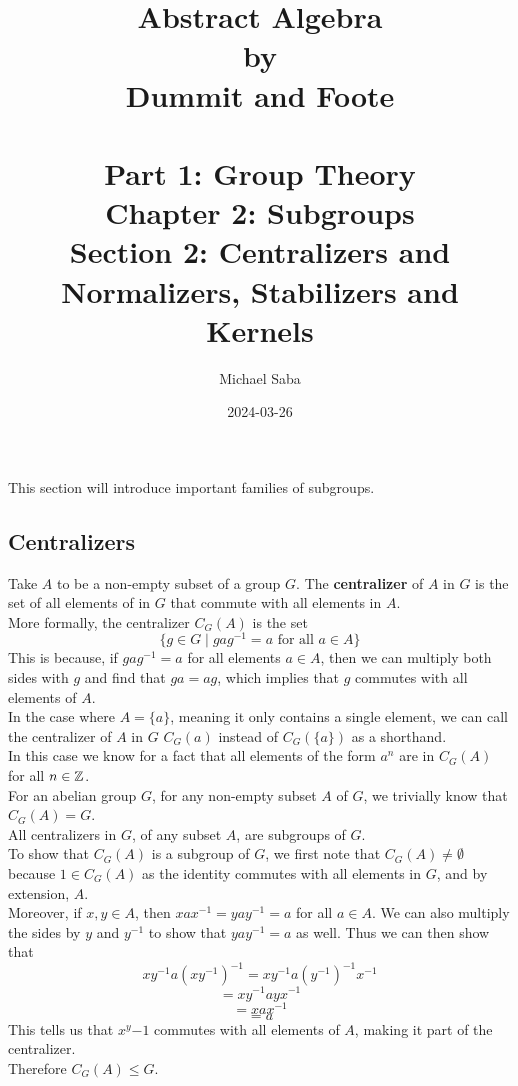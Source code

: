 \documentclass[12pt]{article}
\title{
    \Huge Abstract Algebra \\
    \large by \\
    \Large Dummit and Foote \\~\\
    \huge Part 1: Group Theory \\
    \LARGE Chapter 2: Subgroups \\
    \Large Section 2: Centralizers and Normalizers, Stabilizers and Kernels
}
\date{2024-03-26}
\author{Michael Saba}
\begin{document}
    \maketitle
    \newpage
    \setlength{\parindent}{0pt}

    This section will introduce important families of subgroups. \\

    \subsection*{Centralizers}

    Take $A$ to be a non-empty subset of a group $G$.
    The \textbf{centralizer} of $A$ in $G$
    is the set of all elements of in $G$ that commute with all
    elements in $A$. \\
    More formally, the centralizer $C_G(A)$ is the set
    \[ \{ g \in G \mid gag^{-1} = a \text{ for all } a \in A \} \]
    This is because, if $gag^{-1} = a$ for all elements $a \in A$,
    then we can multiply both sides with $g$
    and find that $ga = ag$,
    which implies that $g$ commutes with all elements of $A$. \\

    In the case where $A = \{a\}$,
    meaning it only contains a single element,
    we can call the centralizer of $A$ in $G$
    $C_G(a)$ instead of $C_G(\{a\})$
    as a shorthand. \\
    In this case we know for a fact that all elements
    of the form $a^n$ are in $C_G(A)$ for all $n \in \mathbb{Z}$. \\

    For an abelian group $G$,
    for any non-empty subset $A$ of $G$,
    we trivially know that $C_G(A) = G$. \\

    All centralizers in $G$, of any subset $A$,
    are subgroups of $G$. \\
    To show that $C_G(A)$ is a subgroup of $G$,
    we first note that $C_G(A) \neq \emptyset$
    because $1 \in C_G(A)$ as the identity
    commutes with all elements in $G$,
    and by extension, $A$. \\
    Moreover, if $x, y \in A$,
    then $xax^{-1} = yay^{-1} = a$ for all $a \in A$.
    We can also multiply the sides by $y$ and $y^{-1}$
    to show that $yay^{-1} = a$ as well.
    Thus we can then show that
    \[ xy^{-1}a(xy^{-1})^{-1} = xy^{-1}a(y^{-1})^{-1}x^{-1} \]
    \[ = xy^{-1}ayx^{-1} \]
    \[ = xax^{-1} \]
    \[ = a \]
    This tells us that $x^y{-1}$ commutes with all elements of $A$,
    making it part of the centralizer. \\
    Therefore $C_G(A) \leqslant G$. \\
\end{document}
